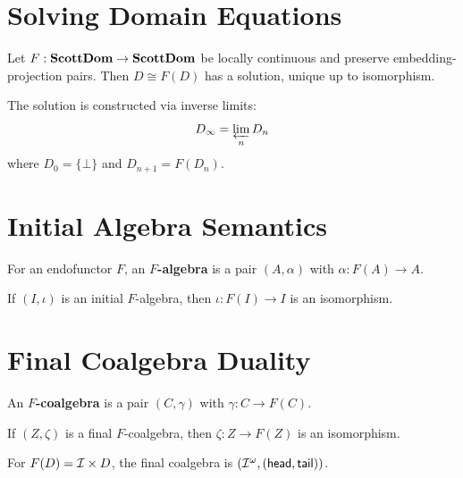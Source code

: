 \section{Solving Domain Equations}

\begin{theorem}
\label{thm:domain-eq-existence}
Let $F : \mathbf{ScottDom} \to \mathbf{ScottDom}$ be locally continuous and preserve
embedding-projection pairs. Then $D \cong F(D)$ has a solution, unique up to isomorphism.
\end{theorem}

\begin{construction}
\label{constr:bilimit}
The solution is constructed via inverse limits:
\[
D_\infty = \varprojlim_n D_n
\]
where $D_0 = \{\bot\}$ and $D_{n+1} = F(D_n)$.
\end{construction}

\section{Initial Algebra Semantics}

\begin{definition}[$F$-Algebra]
\label{def:f-algebra}
For an endofunctor $F$, an \textbf{$F$-algebra} is a pair $(A, \alpha)$ with
$\alpha : F(A) \to A$.
\end{definition}

\begin{theorem}
\label{thm:lambek}
If $(I, \iota)$ is an initial $F$-algebra, then $\iota : F(I) \to I$ is an isomorphism.
\end{theorem}

\section{Final Coalgebra Duality}

\begin{definition}[$F$-Coalgebra]
\label{def:f-coalgebra}
An \textbf{$F$-coalgebra} is a pair $(C, \gamma)$ with $\gamma : C \to F(C)$.
\end{definition}

\begin{theorem}
\label{thm:final-coalgebra-fixpoint}
If $(Z, \zeta)$ is a final $F$-coalgebra, then $\zeta : Z \to F(Z)$ is an isomorphism.
\end{theorem}

\begin{example}
\label{ex:noetic-streams}
For $F(D) = \mathcal{I} \times D$, the final coalgebra is $(\mathcal{I}^\omega, (\mathsf{head}, \mathsf{tail}))$.
\end{example}

